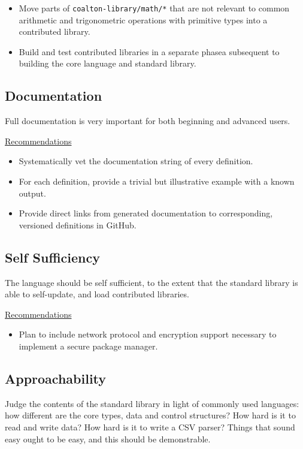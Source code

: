 \documentclass[12pt]{article}
\newcommand{\code}{\texttt}
\begin{document}
\begin{itemize}
\item Move parts of \code{coalton-library/math/*} that are not
  relevant to common arithmetic and trigonometric operations with
  primitive types into a contributed library.
\item Build and test contributed libraries in a separate phasea
  subsequent to building the core language and standard library.
\end{itemize}

\subsection{Documentation}

Full documentation is very important for both beginning and advanced
users.

\medskip
\underline{Recommendations}

\begin{itemize}
\item Systematically vet the documentation string of every definition.
\item For each definition, provide a trivial but illustrative example
  with a known output.
\item Provide direct links from generated documentation to
  corresponding, versioned definitions in GitHub.
\end{itemize}

\subsection{Self Sufficiency}

The language should be self sufficient, to the extent that the
standard library is able to self-update, and load contributed
libraries.

\medskip
\underline{Recommendations}

\begin{itemize}
\item Plan to include network protocol and encryption support
  necessary to implement a secure package manager.
\end{itemize}

\subsection{Approachability}

Judge the contents of the standard library in light of commonly used
languages: how different are the core types, data and control
structures? How hard is it to read and write data? How hard is it to
write a CSV parser? Things that sound easy ought to be easy, and this
should be demonstrable.
\end{document}
